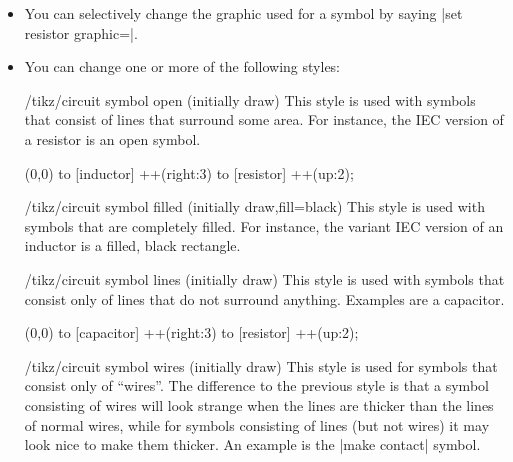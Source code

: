 \begin{itemize}
\begin{codeexample}[]
\end{codeexample}
    \item You can selectively change the graphic used for a symbol by saying
        |set resistor graphic=|.
    \item You can change one or more of the following styles:
        \begin{stylekey}{/tikz/circuit symbol open (initially draw)}
            This style is used with symbols that consist of lines that surround
            some area. For instance, the IEC version of a resistor is an open
            symbol.
\begin{codeexample}[]
\tikz [circuit ee IEC,
       circuit symbol open/.style={thick,draw,fill=yellow}]
  \draw (0,0) to [inductor] ++(right:3) to [resistor] ++(up:2);
\end{codeexample}
        \end{stylekey}
        \begin{stylekey}{/tikz/circuit symbol filled (initially {draw,fill=black})}
            This style is used with symbols that are completely filled. For
            instance, the variant IEC version of an inductor is a filled, black
            rectangle.
        \end{stylekey}
        \begin{stylekey}{/tikz/circuit symbol lines (initially draw)}
            This style is used with symbols that consist only of lines that do
            not surround anything. Examples are a capacitor.
\begin{codeexample}[]
\tikz [circuit ee IEC,
       circuit symbol lines/.style={thick,draw=red}]
  \draw (0,0) to [capacitor] ++(right:3) to [resistor] ++(up:2);
\end{codeexample}
        \end{stylekey}
        \begin{stylekey}{/tikz/circuit symbol wires (initially draw)}
            This style is used for symbols that consist only of ``wires''. The
            difference to the previous style is that a symbol consisting of
            wires will look strange when the lines are thicker than the lines
            of normal wires, while for symbols consisting of lines (but not
            wires) it may look nice to make them thicker. An example is the
            |make contact| symbol.


\end{stylekey}
\end{itemize}
